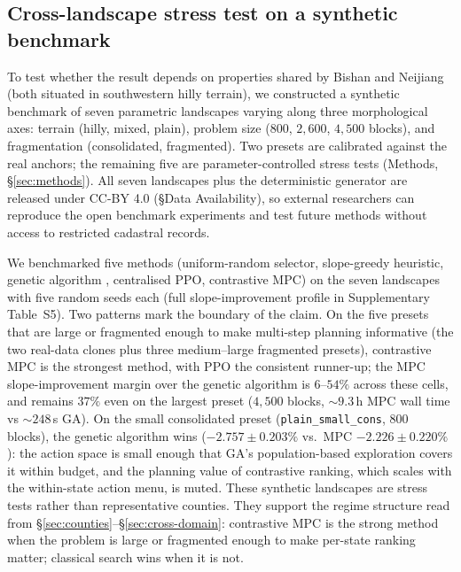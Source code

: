 \documentclass[11pt]{article}
\begin{document}
\subsection{Cross-landscape stress test on a synthetic benchmark}\label{sec:bench}

To test whether the result depends on properties shared by Bishan and Neijiang (both situated in southwestern hilly terrain), we constructed a synthetic benchmark of seven parametric landscapes varying along three morphological axes: terrain (hilly, mixed, plain), problem size ($800$, $2{,}600$, $4{,}500$ blocks), and fragmentation (consolidated, fragmented). Two presets are calibrated against the real anchors; the remaining five are parameter-controlled stress tests (Methods, \S\ref{sec:methods}). All seven landscapes plus the deterministic generator are released under CC-BY 4.0 (\S Data Availability), so external researchers can reproduce the open benchmark experiments and test future methods without access to restricted cadastral records.

We benchmarked five methods (uniform-random selector, slope-greedy heuristic, genetic algorithm \citep{cao2012boundary}, centralised PPO, contrastive MPC) on the seven landscapes with five random seeds each (full slope-improvement profile in Supplementary Table~S5). Two patterns mark the boundary of the claim. On the five presets that are large or fragmented enough to make multi-step planning informative (the two real-data clones plus three medium--large fragmented presets), contrastive MPC is the strongest method, with PPO the consistent runner-up; the MPC slope-improvement margin over the genetic algorithm is $6$--$54\%$ across these cells, and remains $37\%$ even on the largest preset ($4{,}500$ blocks, $\sim$$9.3$\,h MPC wall time vs $\sim$$248$\,s GA). On the small consolidated preset (\texttt{plain\_small\_cons}, $800$ blocks), the genetic algorithm wins ($-2.757 \pm 0.203\%$ vs.\ MPC $-2.226 \pm 0.220\%$): the action space is small enough that GA's population-based exploration covers it within budget, and the planning value of contrastive ranking, which scales with the within-state action menu, is muted. These synthetic landscapes are stress tests rather than representative counties. They support the regime structure read from \S\ref{sec:counties}--\S\ref{sec:cross-domain}: contrastive MPC is the strong method when the problem is large or fragmented enough to make per-state ranking matter; classical search wins when it is not.
\end{document}
